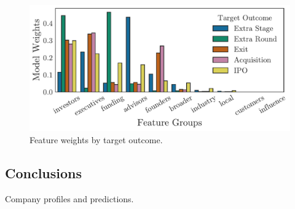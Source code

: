 \documentclass[../thesis/thesis.tex]{subfiles}
\begin{document}

\begin{figure}[!htb]
    \centering
    \includegraphics[width=\textwidth]{../figures/evaluation/features_outcome}
    \caption[Feature weights by target outcome]{Feature weights by target outcome.}
    \label{fig:evaluation:feature_groups_outcome}
\end{figure}

\subsection{Conclusions}



\begin{table}[!htb]
    \centering
    \scalebox{0.9}{}
    \caption[Company profiles and predictions]{Company profiles and predictions.}
    \label{fig:evaluation:example_predictions}
\end{table}

\end{document}
